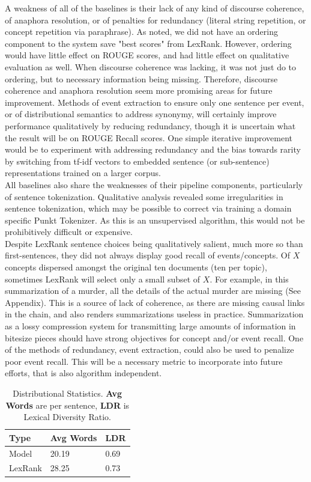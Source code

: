 \documentclass[11pt]{article}
\begin{document}
A weakness of all of the baselines is their lack of any kind of discourse coherence, of anaphora resolution, or of penalties for redundancy (literal string repetition, or concept repetition via paraphrase). As noted, we did not have an ordering component to the system save "best scores" from LexRank. However, ordering would have little effect on ROUGE scores, and had little effect on qualitative evaluation as well. When discourse coherence was lacking, it was not just do to ordering, but to necessary information being missing. Therefore, discourse coherence and anaphora resolution seem more promising areas for future improvement. Methods of event extraction to ensure only one sentence per event, or of distributional semantics to address synonymy, will certainly improve performance qualitatively by reducing redundancy, though it is uncertain what the result will be on ROUGE Recall scores. One simple iterative improvement would be to experiment with addressing redundancy and the bias towards rarity by switching from tf-idf vectors to embedded sentence (or sub-sentence) representations trained on a larger corpus.\\
All baselines also share the weaknesses of their pipeline components, particularly of sentence tokenization. Qualitative analysis revealed some irregularities in sentence tokenization, which may be possible to correct via training a domain specific Punkt Tokenizer. As this is an unsupervised algorithm, this would not be prohibitively difficult or expensive.\\
Despite LexRank sentence choices being qualitatively salient, much more so than first-sentences, they did not always display good recall of events/concepts. Of $X$ concepts dispersed amongst the original ten documents (ten per topic), sometimes LexRank will select only a small subset of $X$. For example, in this summarization of a murder, all the details of the actual murder are missing (See Appendix). This is a source of lack of coherence, as there are missing causal links in the chain, and also renders summarizations useless in practice. Summarization as a lossy compression system for transmitting large amounts of information in bitesize pieces should have strong objectives for concept and/or event recall. One of the methods of redundancy, event extraction, could also be used to penalize poor event recall. This will be a necessary metric to incorporate into future efforts, that is also algorithm independent.

\begin{table}
\begin{center}
\begin{tabular}{lp{1cm}p{1cm}}
\hline \bf Type & \bf Avg Words & \bf LDR \\ \hline
Model & 20.19 & 0.69 \\
LexRank & 28.25 & 0.73 \\
\hline
\end{tabular}
\caption{\label{results-table} Distributional Statistics. \textbf{Avg Words} are per sentence, \textbf{LDR} is Lexical Diversity Ratio.}
\end{center}
\end{table}
\end{document}
